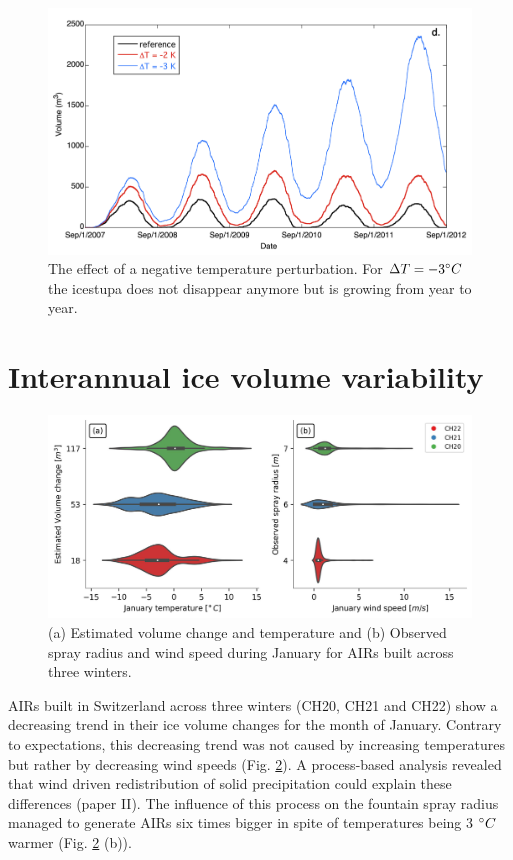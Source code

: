 \begin{figure}[htb]
	\centering
	\includegraphics[width=\textwidth]{figs/PIR_evolution.png}
	\caption{The effect of a negative temperature perturbation. For $\Delta T = -3 ^{\circ} C$ the icestupa does
		not disappear anymore but is growing from year to year.}
	\label{fig:PIR_evolution}
\end{figure}


\section{Interannual ice volume variability}
\label{sec:interannual}

\begin{figure}[htb]
	\centering
	\includegraphics[width=\textwidth]{figs/CH_diffs.jpg}
	\caption{(a) Estimated volume change and temperature and (b) Observed spray radius and wind speed
		during January for \ac{AIRs} built across three winters. }
	\label{fig:CH_diffs}
\end{figure}

\ac{AIRs} built in Switzerland across three winters (CH20, CH21 and CH22) show a decreasing trend in their ice volume
changes for the month of January. Contrary to expectations, this decreasing trend was not caused by increasing
temperatures but rather by decreasing wind speeds (Fig. \ref{fig:CH_diffs}). A process-based analysis revealed
that wind driven redistribution of solid precipitation could explain these differences (paper II). The influence of this process on
the fountain spray radius managed to generate \ac{AIRs} six times bigger in spite of temperatures being 3 $^{\circ} C$
warmer (Fig. \ref{fig:CH_diffs} (b)).



